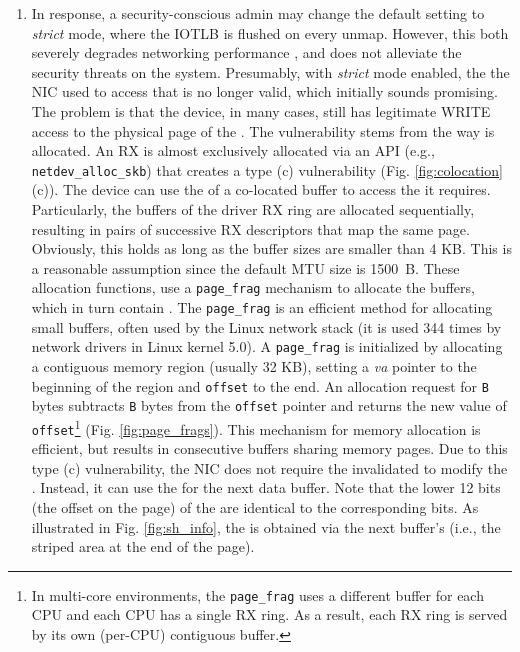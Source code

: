 \begin{enumerate}[label=(\roman*),wide, labelwidth=!, labelindent=0pt]
\item In response, a security-conscious admin may change the default setting to \emph{strict} mode, where the IOTLB is flushed on every unmap. However, this both severely degrades networking performance \cite{MMT16,MSMT18}, and does not alleviate the security threats on the system. Presumably, with \emph{strict} mode enabled, the \iova{} the NIC used to access that \shinfo{} is no longer valid, which initially sounds promising. The problem is that the device, in many cases, still has legitimate WRITE access to the physical page of the \shinfo. The vulnerability stems from the way \data{} is allocated. An RX \skb{} is almost exclusively allocated via an API (e.g., \texttt{netdev\_alloc\_skb}) that creates a type (c) \subpage{} vulnerability (Fig. \ref{fig:colocation}(c)). The device can use the \iova{} of a co-located buffer to access the \shinfo{} it requires. Particularly, the buffers of the driver RX ring are allocated sequentially, resulting in pairs of successive RX descriptors that map the same page. Obviously, this holds as long as the buffer sizes are smaller than 4 KB. This is a reasonable assumption since the default MTU size is 1500~B. These allocation functions, use a \texttt{page\_frag} mechanism to allocate the \data{} buffers, which in turn contain \shinfo. The \texttt{page\_frag} is an efficient method for allocating small buffers, often used by the Linux network stack (it is used 344 times by network drivers in Linux kernel 5.0). A \texttt{page\_frag} is initialized by allocating a contiguous memory region (usually 32 KB), setting a \textit{va} pointer to the beginning of the region and \texttt{offset} to the end. An allocation request for \texttt{B} bytes subtracts \texttt{B} bytes from the \texttt{offset} pointer and returns the new value of \texttt{offset}\footnote{In multi-core environments, the \texttt{page\_frag} uses a different buffer for each CPU and each CPU has a single RX ring. As a result, each RX ring is served by its own (per-CPU) contiguous buffer.} (Fig. \ref{fig:page_frags}). This mechanism for memory allocation is efficient, but results in consecutive \data{} buffers sharing memory pages. Due to this type (c) \subpage{} vulnerability, the NIC does not require the invalidated \iova{} to modify the \shinfo. Instead, it can use the \iova{} for the next data buffer. Note that the lower 12 bits (the offset on the page) of the \iova{} are identical to the corresponding \kva{} bits. As illustrated in Fig. \ref{fig:sh_info}, the \oportunity{} is obtained via the next buffer's \iova{} (i.e., the striped area at the end of the page).
\end{enumerate}

